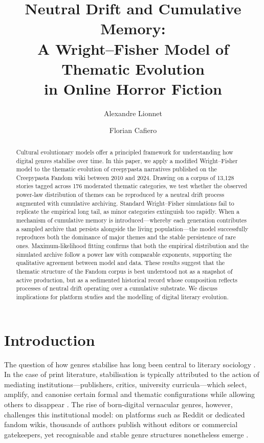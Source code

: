 \documentclass{anthology-ch}         %
\title{Neutral Drift and Cumulative Memory:\\
A Wright--Fisher Model of Thematic Evolution\\
in Online Horror Fiction}
\author[1,3]{Alexandre Lionnet}[
  orcid=0009-0002-1131-8447
]
\author[2,3]{Florian Cafiero}[
  orcid=0000-0002-1951-6942
]
\affiliation{1}{École Pratique des Hautes Études -- PSL, Paris}
\affiliation{2}{École Nationale des Chartes -- PSL, Paris}
\affiliation{3}{Centre Jean Mabillon, Paris}
\begin{document}
\maketitle

\begin{abstract}
Cultural evolutionary models offer a principled framework for understanding how digital genres stabilise over time. In this paper, we apply a modified Wright--Fisher model to the thematic evolution of creepypasta narratives published on the Creepypasta Fandom wiki between 2010 and 2024.
Drawing on a corpus of 13,128 stories tagged across 176 moderated thematic categories, we test whether the observed power-law distribution of themes can be reproduced by a neutral drift process augmented with cumulative archiving. 
Standard Wright--Fisher simulations fail to replicate the empirical long tail, as minor categories extinguish too rapidly. When a mechanism of cumulative memory is introduced---whereby each generation contributes a sampled archive that persists alongside the living population---the model successfully reproduces both the dominance of major themes and the stable persistence of rare ones. 
Maximum-likelihood fitting confirms that both the empirical distribution and the simulated archive follow a power law with comparable exponents, supporting the qualitative agreement between model and data. These results suggest that the thematic structure of the Fandom corpus is best understood not as a snapshot of active production, but as a sedimented historical record whose composition reflects processes of neutral drift operating over a cumulative substrate. We discuss implications for platform studies and the modelling of digital literary evolution.
\end{abstract}

\section{Introduction} 

The question of how genres stabilise has long been central to literary sociology \cite{guillory1993cultural}. In the case of print literature, stabilisation is typically attributed to the action of mediating institutions---publishers, critics, university curricula---which select, amplify, and canonise certain formal and thematic configurations while allowing others to disappear \cite{moretti2000slaughterhouse}. 
The rise of born-digital vernacular genres, however, challenges this institutional model: on platforms such as Reddit or dedicated fandom wikis, thousands of authors publish without editors or commercial gatekeepers, yet recognisable and stable genre structures nonetheless emerge \cite{howard2008networked, blank_folklore_2009}.
\end{document}
